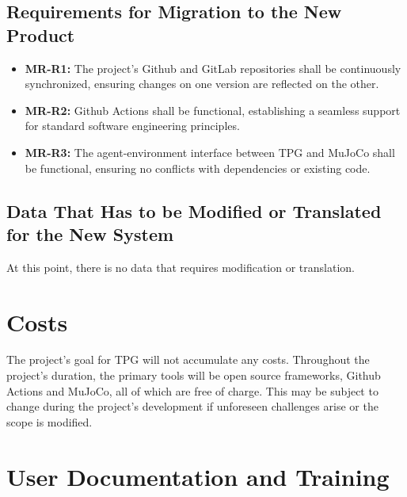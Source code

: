\documentclass[12pt]{article}
\begin{document}
\subsection{Requirements for Migration to the New Product}
\begin{itemize}
  \item \textbf{MR-R1:} The project’s Github and GitLab repositories shall be continuously synchronized, ensuring changes on one version are reflected on the other.
  \item \textbf{MR-R2:} Github Actions shall be functional, establishing a seamless support for standard software engineering principles.
  \item \textbf{MR-R3:} The agent-environment interface between TPG and MuJoCo shall be functional, ensuring no conflicts with dependencies or existing code.
\end{itemize}

\subsection{Data That Has to be Modified or Translated for the New System}
At this point, there is no data that requires modification or translation.

\section{Costs}
The project's goal for TPG will not accumulate any costs. Throughout the project's duration, the primary tools will be open source frameworks, Github Actions and MuJoCo, all of which are free of charge. This may be subject to change during the project's development if unforeseen challenges arise or the scope is modified.

\section{User Documentation and Training}
\end{document}
